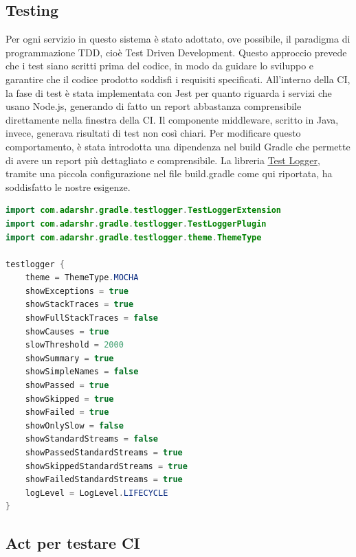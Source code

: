 \subsection{Testing}

Per ogni servizio in questo sistema è stato adottato, ove possibile, il paradigma di programmazione TDD, cioè Test Driven Development. Questo approccio prevede che i test siano scritti prima del codice, in modo da guidare lo sviluppo e garantire che il codice prodotto soddisfi i requisiti specificati.
All'interno della CI, la fase di test è stata implementata con Jest per quanto riguarda i servizi che usano Node.js, generando di fatto un report abbastanza comprensibile direttamente nella finestra della CI. Il componente middleware, scritto in Java, invece, generava risultati di test non così chiari. Per modificare questo comportamento, è stata introdotta una dipendenza nel build Gradle che permette di avere un report più dettagliato e comprensibile. 
La libreria \href{https://plugins.gradle.org/plugin/com.adarshr.test-logger}{\underline{Test Logger}}, tramite una piccola configurazione nel file build.gradle come qui riportata, ha soddisfatto le nostre esigenze.

\begin{lstlisting}[language=Java, caption={Test logger}, label=list:gradle_testlogger]
import com.adarshr.gradle.testlogger.TestLoggerExtension
import com.adarshr.gradle.testlogger.TestLoggerPlugin
import com.adarshr.gradle.testlogger.theme.ThemeType

testlogger {
    theme = ThemeType.MOCHA
    showExceptions = true
    showStackTraces = true
    showFullStackTraces = false
    showCauses = true
    slowThreshold = 2000
    showSummary = true
    showSimpleNames = false
    showPassed = true
    showSkipped = true
    showFailed = true
    showOnlySlow = false
    showStandardStreams = false
    showPassedStandardStreams = true
    showSkippedStandardStreams = true
    showFailedStandardStreams = true
    logLevel = LogLevel.LIFECYCLE
}
\end{lstlisting}

\subsection{Act per testare CI}

